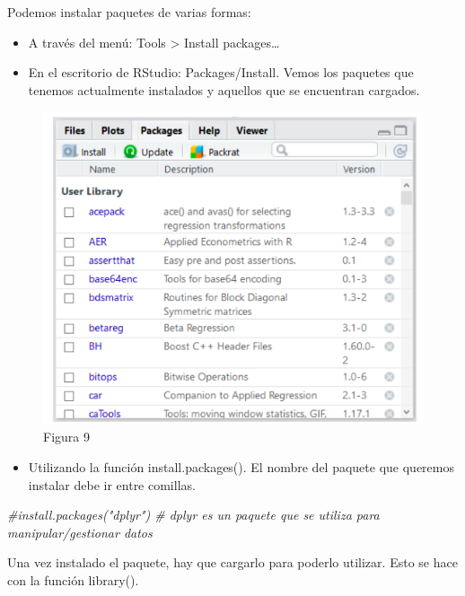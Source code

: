 \documentclass[
]{book}
\newenvironment{Shaded}{\begin{snugshade}}{\end{snugshade}}
\newcommand{\CommentTok}[1]{\textcolor[rgb]{0.56,0.35,0.01}{\textit{#1}}}
\providecommand{\tightlist}{%
  \setlength{\itemsep}{0pt}\setlength{\parskip}{0pt}}
\begin{document}
Podemos instalar paquetes de varias formas:

\begin{itemize}
\item
  A través del menú: Tools \textgreater{} Install packages\ldots{}
\item
  En el escritorio de RStudio: Packages/Install. Vemos los paquetes que tenemos actualmente instalados y aquellos que se encuentran cargados.
\end{itemize}

\begin{figure}
\centering
\includegraphics{imagenes/10.png}
\caption{Figura 9}
\end{figure}

\begin{itemize}
\tightlist
\item
  Utilizando la función install.packages(). El nombre del paquete que queremos instalar debe ir entre comillas.
\end{itemize}

\begin{Shaded}
\begin{Highlighting}[]
\CommentTok{\#install.packages("dplyr") \# dplyr es un paquete que se utiliza para manipular/gestionar datos}
\end{Highlighting}
\end{Shaded}

Una vez instalado el paquete, hay que cargarlo para poderlo utilizar. Esto se hace con la función library().
\end{document}
